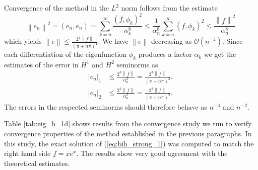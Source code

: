 \documentclass[a4paper,10pt]{article}
\newcommand{\norm}[1]{\ensuremath{\left\|#1\right\|}}
\newcommand{\seminorm}[1]{\ensuremath{\left|#1\right|}}
\newcommand{\inner}[2]{\ensuremath{\left(#1, #2\right)}}
\begin{document}
  Convergence of the method in the $L^2$ norm follows from the estimate
  \[
    \norm{e_n}^2=\inner{e_n}{e_n} = \sum_{k=n}^{\infty}\frac{\inner{f}{\phi_k}^2}{\alpha^8_k} \leq
      \frac{1}{\alpha^8_n}\sum_{k=n}^{\infty} (f, \phi_k)^2 \leq
      \frac{\norm{f}^2}{\alpha^8_n}
  \]
  which yields $\norm{e}\leq\frac{2^4\norm{f}}{\left(\pi + n\pi\right)^4}$.
  We have $\norm{e}$ decreasing as $\mathcal{O}(n^{-4})$. Since each
  differentiation of the eigenfunction  $\phi_k$ produces a factor $\alpha_k$
  we get the estimates of the error in 
  $H^1$ and $H^2$ seminorms as
  \begin{align*}
    \seminorm{e_n}_1 &\leq \frac{2^3\norm{f}}{\alpha^3_n} =
    \frac{2^3\norm{f}}{\left(\pi + n\pi\right)^3}, \\
    \seminorm{e_n}_2 &\leq \frac{2^2\norm{f}}{\alpha^2_n} =
    \frac{2^2\norm{f}}{\left(\pi + n\pi\right)^2}.
  \end{align*}
  The errors in the respected seminorms should therefore behave as
  $n^{-3}$ and $n^{-2}$.
    
  Table \ref{tab:eig_b_1d} shows results from the convergence study we run to
  verify convergence properties of the method established in the previous
  paragraphs. In this study, the exact solution of (\ref{eq:bih_strong_1}) was
  computed to match the right hand side $f=x e^x$. The results show very good
  agreement with the theoretical estimates.
\end{document}
